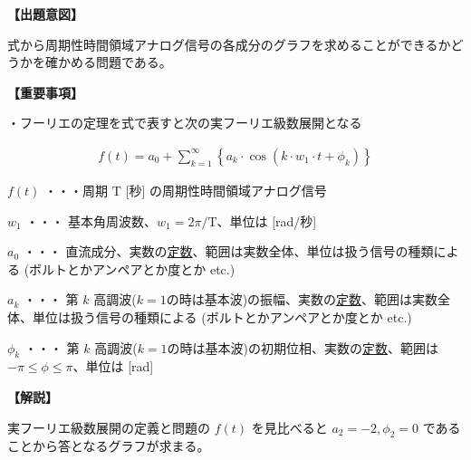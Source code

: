 \noindent \textbf{【出題意図】}

\noindent 式から周期性時間領域アナログ信号の各成分のグラフを求めることができるかどうかを確かめる問題である。

\vspace{1em}
\noindent \textbf{【重要事項】}

\medskip
\noindent ・フーリエの定理を式で表すと次の実フーリエ級数展開となる

\begin{align*}
f(t) = a_0 + \sum_{k=1}^{\infty}
\left \{
a_k \cdot \cos (k \cdot w_1 \cdot t + \phi_k)
\right \}
\end{align*}

\medskip
\noindent $f(t)$ ・・・周期 $\textrm{T}$ [秒] の周期性時間領域アナログ信号

\medskip
\noindent $w_1$ ・・・ 基本角周波数、$w_1 = 2\pi/\textrm{T}$、単位は [rad/秒]

\medskip
\noindent $a_0$ ・・・ 直流成分、実数の\underline{定数}、範囲は実数全体、単位は扱う信号の種類による (ボルトとかアンペアとか度とか etc.)

\medskip
\noindent $a_k$ ・・・ 第 $k$ 高調波($k=1$の時は基本波)の振幅、実数の\underline{定数}、範囲は実数全体、単位は扱う信号の種類による (ボルトとかアンペアとか度とか etc.)

\medskip
\noindent $\phi_k$ ・・・ 第 $k$ 高調波($k=1$の時は基本波)の初期位相、実数の\underline{定数}、範囲は $-\pi \leq \phi \leq \pi$、単位は [rad]


\vspace{1em}
\noindent \textbf{【解説】}

\noindent 実フーリエ級数展開の定義と問題の $f(t)$ を見比べると $a_2 = -2, \phi_2 = 0$ であることから答となるグラフが求まる。
